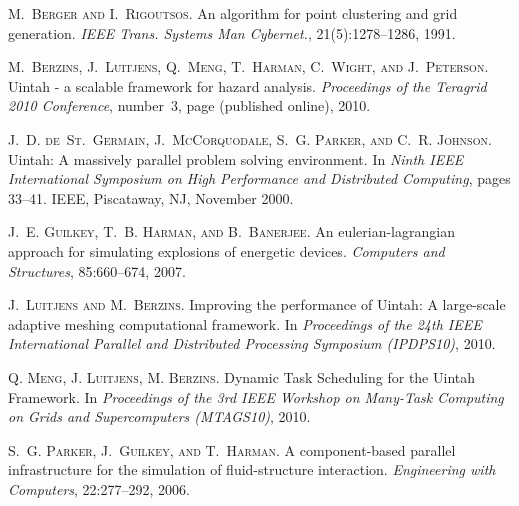 
\begin{thebibliography}{10}
\textsc{M.~Berger and I.~Rigoutsos}. {An algorithm for point clustering and grid generation}. {\em IEEE Trans. Systems Man Cybernet.}, 21(5):1278--1286, 1991.

\textsc{M.~Berzins, J.~Luitjens, Q.~Meng, T.~Harman, C.~Wight, and J.~Peterson}. {Uintah - a scalable framework for hazard analysis.} {\em Proceedings of the Teragrid 2010 Conference}, number~3, page (published online), 2010.

\textsc{J.~D. de~St.~Germain, J.~McCorquodale, S.~G. Parker, and C.~R. Johnson}. {{U}intah: {A} massively parallel problem solving environment}. In {\em Ninth {IEEE} International Symposium on High Performance and Distributed Computing}, pages 33--41. {IEEE}, Piscataway, NJ, November 2000.

\textsc{J.~E. Guilkey, T.~B. Harman, and B.~Banerjee}. {An eulerian-lagrangian approach for simulating explosions of energetic devices}. {\em Computers and Structures}, 85:660--674, 2007.
 
\textsc{J.~Luitjens and M.~Berzins}. {Improving the performance of {U}intah: {A} large-scale adaptive meshing computational framework}. In {\em Proceedings of the 24th IEEE International Parallel and Distributed Processing Symposium (IPDPS10)}, 2010. 

\textsc{Q. Meng, J. Luitjens, M. Berzins}. {Dynamic Task Scheduling for the Uintah Framework}. In {\em Proceedings of the 3rd IEEE Workshop on Many-Task Computing on Grids and Supercomputers (MTAGS10)}, 2010.

\textsc{S.~G. Parker, J.~Guilkey, and T.~Harman}. {A component-based parallel infrastructure for the simulation of fluid-structure interaction}. {\em Engineering with Computers}, 22:277--292, 2006.
\end{thebibliography}